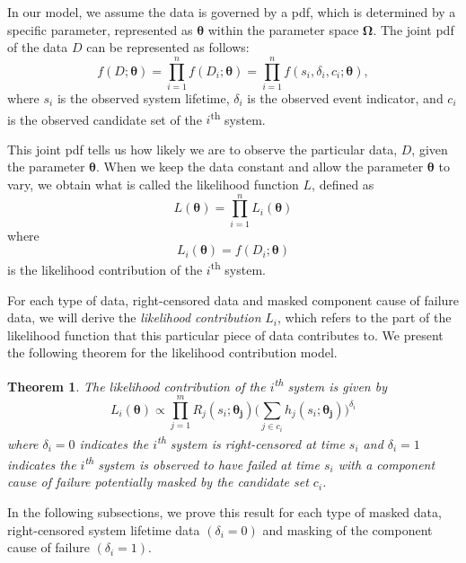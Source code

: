 \documentclass[
]{article}
\theoremstyle{definition}
\theoremstyle{plain}
\newtheorem{theorem}{Theorem}[section]
\theoremstyle{definition}
\theoremstyle{definition}
\theoremstyle{definition}
\theoremstyle{definition}
\theoremstyle{remark}
\begin{document}
In our model, we assume the data is governed by a pdf, which is determined by
a specific parameter, represented as \(\boldsymbol{\theta}\) within the parameter space \(\boldsymbol{\Omega}\).
The joint pdf of the data \(D\) can be represented as follows:
\[
f(D ; \boldsymbol{\theta}) = \prod_{i=1}^n f(D_i;\boldsymbol{\theta}) = \prod_{i=1}^n f(s_i,\delta_i,c_i;\boldsymbol{\theta}),
\]
where \(s_i\) is the observed system lifetime, \(\delta_i\) is the observed event
indicator, and \(c_i\) is the observed candidate set of the \(i\)\textsuperscript{th} system.

This joint pdf tells us how likely we are to observe the particular data, \(D\), given
the parameter \(\boldsymbol{\theta}\). When we keep the data constant and allow the parameter
\(\boldsymbol{\theta}\) to vary, we obtain what is called the likelihood function \(L\), defined as
\[
L(\boldsymbol{\theta}) = \prod_{i=1}^n L_i(\boldsymbol{\theta})
\]
where
\[
L_i(\boldsymbol{\theta}) = f(D_i;\boldsymbol{\theta})
\]
is the likelihood contribution of the \(i\)\textsuperscript{th} system.

For each type of data, right-censored data and masked component cause of
failure data, we will derive the \emph{likelihood contribution} \(L_i\), which refers
to the part of the likelihood function that this particular piece of data
contributes to. We present the following theorem for the likelihood contribution
model.

\begin{theorem}
\protect\hypertarget{thm:likelihood-contribution}{}\label{thm:likelihood-contribution}The likelihood contribution of the \(i\)\textsuperscript{th} system is given by
\begin{equation}
\label{eq:like}
L_i(\boldsymbol{\theta}) \propto \prod_{j=1}^m R_j(s_i;\boldsymbol{\theta_j}) \biggl(\sum_{j \in c_i} h_j(s_i;\boldsymbol{\theta_j}) \biggr)^{\delta_i}
\end{equation}
where \(\delta_i = 0\) indicates the \(i\)\textsuperscript{th} system is
right-censored at time \(s_i\) and \(\delta_i = 1\) indicates the \(i\)\textsuperscript{th} system
is observed to have failed at time \(s_i\) with a component cause of failure potentially masked
by the candidate set \(c_i\).
\end{theorem}

In the following subsections, we prove this result for each type of masked data,
right-censored system lifetime data \((\delta_i = 0)\) and masking of the
component cause of failure \((\delta_i = 1)\).
\end{document}
